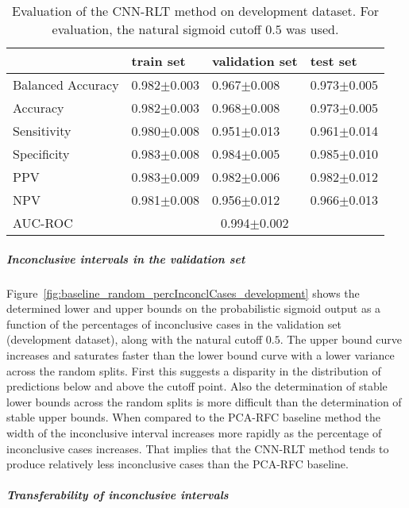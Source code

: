 \begin{table}[ht]
  \caption{Evaluation of the CNN-RLT method on development dataset. 
  For evaluation, the natural sigmoid cutoff $0.5$ was used.}
  \centering
  \begin{tabular}{llll}
      \hline
                        & train set         & validation set      & test set             \\
      \hline
      Balanced Accuracy & 0.982$\pm$0.003   &  0.967$\pm$0.008    &  0.973$\pm$0.005  \\
      Accuracy          & 0.982$\pm$0.003    &   0.968$\pm$0.008   &  0.973$\pm$0.005  \\
      Sensitivity       &  0.980$\pm$0.008  &   0.951$\pm$0.013  &  0.961$\pm$0.014 \\
      Specificity       &   0.983$\pm$0.008   &   0.984$\pm$0.005  &   0.985$\pm$0.010 \\
      PPV               &  0.983$\pm$0.009   &   0.982$\pm$0.006   &  0.982$\pm$0.012   \\
      NPV               &  0.981$\pm$0.008   &   0.956$\pm$0.012   & 0.966$\pm$0.013  \\
      \hline
      AUC-ROC          &  \multicolumn{3}{c}{0.994$\pm$0.002}  \\
      \hline
  \end{tabular}
 \label{t1:cnn_rlt_perf_eval_table}
\end{table}


\subparagraph{Inconclusive intervals in the validation set}

Figure~\ref{fig:baseline_random_percInconclCases_development} shows the determined lower and upper bounds on the 
probabilistic sigmoid output as a function of the percentages of inconclusive cases 
in the validation set (development dataset), along with the natural cutoff $0.5$.
The upper bound curve increases and saturates faster than the lower bound curve with a lower variance across 
the random splits.
First this suggests a disparity in the distribution of predictions below and above the cutoff point.
Also the determination of stable lower bounds across the random splits is more difficult
than the determination of stable upper bounds.
When compared to the PCA-RFC baseline method 
the width of the inconclusive interval increases more rapidly as the percentage of inconclusive cases increases.
That implies that the CNN-RLT method tends to produce relatively less inconclusive cases than the PCA-RFC baseline.

\subparagraph{Transferability of inconclusive intervals}

